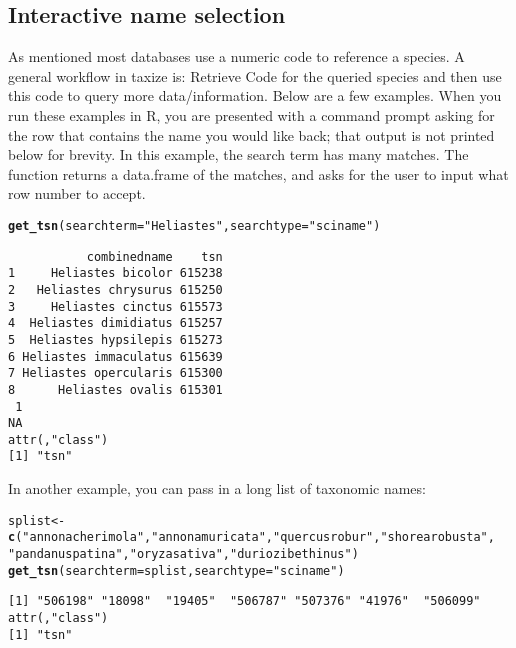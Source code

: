 \documentclass[10pt]{article}\usepackage[]{graphicx}\usepackage[]{color}
\makeatletter
\newcommand{\hlstr}[1]{\textcolor[rgb]{0.192,0.494,0.8}{#1}}%
\newcommand{\hlkwd}[1]{\textcolor[rgb]{0.737,0.353,0.396}{\textbf{#1}}}%
\newenvironment{kframe}{%
 \def\at@end@of@kframe{}%
 \ifinner\ifhmode%
  \def\at@end@of@kframe{\end{minipage}}%
  \begin{minipage}{\columnwidth}%
 \fi\fi%
 \def\FrameCommand##1{\hskip\@totalleftmargin \hskip-\fboxsep
 \colorbox{shadecolor}{##1}\hskip-\fboxsep
     \hskip-\linewidth \hskip-\@totalleftmargin \hskip\columnwidth}%
 \MakeFramed {\advance\hsize-\width
   \@totalleftmargin\z@ \linewidth\hsize
   \@setminipage}}%
 {\par\unskip\endMakeFramed%
 \at@end@of@kframe}
\newenvironment{knitrout}{}{} %
\makeatother
\begin{document}
\subsection*{Interactive name selection}
As mentioned most databases use a numeric code to reference a species. A general workflow in taxize is: Retrieve Code for the queried species and then use this code to query more data/information.
Below are a few examples. When you run these examples in R, you are presented with a command prompt asking for the row that contains the name you would like back; that output is not printed below for brevity. In this example, the search term has many matches. The function returns a data.frame of the matches, and asks for the user to input what row number to accept. 

\begin{knitrout}
\color{fgcolor}\begin{kframe}
\begin{alltt}
\hlkwd{get_tsn}(searchterm = \hlstr{"Heliastes"}, searchtype = \hlstr{"sciname"})
\end{alltt}
\begin{verbatim}
           combinedname    tsn
1     Heliastes bicolor 615238
2   Heliastes chrysurus 615250
3     Heliastes cinctus 615573
4  Heliastes dimidiatus 615257
5  Heliastes hypsilepis 615273
6 Heliastes immaculatus 615639
7 Heliastes opercularis 615300
8      Heliastes ovalis 615301
 1 
NA 
attr(,"class")
[1] "tsn"
\end{verbatim}
\end{kframe}
\end{knitrout}


In another example, you can pass in a long list of taxonomic names:

\begin{knitrout}
\color{fgcolor}\begin{kframe}
\begin{alltt}
splist <- \hlkwd{c}(\hlstr{"annona cherimola"}, \hlstr{"annona muricata"}, \hlstr{"quercus robur"}, \hlstr{"shorea robusta"}, 
    \hlstr{"pandanus patina"}, \hlstr{"oryza sativa"}, \hlstr{"durio zibethinus"})
\hlkwd{get_tsn}(searchterm = splist, searchtype = \hlstr{"sciname"})
\end{alltt}
\begin{verbatim}
[1] "506198" "18098"  "19405"  "506787" "507376" "41976"  "506099"
attr(,"class")
[1] "tsn"
\end{verbatim}
\end{kframe}
\end{knitrout}
\end{document}
